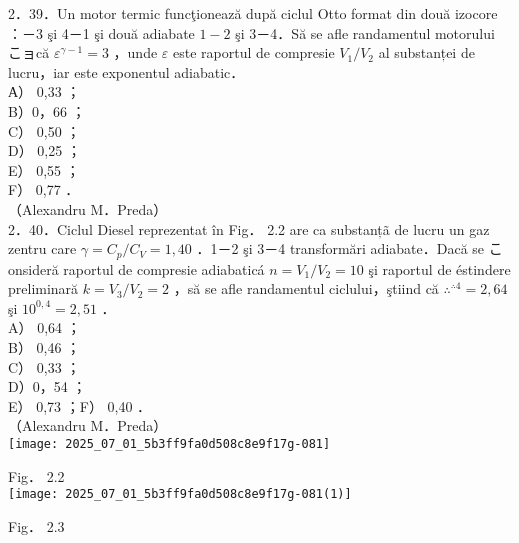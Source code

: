 2．39．Un motor termic funcţionează după ciclul Otto format din două izocore ：－3 şi 4－1 şi două adiabate $1-2$ şi 3－4．Să se afle randamentul motorului こョcă $\varepsilon^{\gamma-1}=3$ ，unde $\varepsilon$ este raportul de compresie $V_{1} / V_{2}$ al substanței de lucru，iar este exponentul adiabatic．\\
А） 0,33 ；\\
B）0，66 ；\\
C） 0,50 ；\\
D） 0,25 ；\\
E） 0,55 ；\\
F） 0,77 ．\\
（Alexandru M．Preda）\\
2．40．Ciclul Diesel reprezentat în Fig． 2.2 are ca substanțã de lucru un gaz zentru care $\gamma=C_{p} / C_{V}=1,40$ ．1－2 şi 3－4 transformări adiabate．Dacă se こonsideră raportul de compresie adiabaticá $n=V_{1} / V_{2}=10$ şi raportul de éstindere preliminară $k=V_{3} / V_{2}=2$ ，să se afle randamentul ciclului，ştiind că $\therefore^{\therefore 4}=2,64$ şi $10^{0,4}=2,51$ ．\\
A） 0,64 ；\\
B） 0,46 ；\\
C） 0,33 ；\\
D）0，54 ；\\
E） 0,73 ；F） 0,40 ．\\
（Alexandru M．Preda）\\
\texttt{[image: 2025\_07\_01\_5b3ff9fa0d508c8e9f17g-081]}

Fig． 2.2\\
\texttt{[image: 2025\_07\_01\_5b3ff9fa0d508c8e9f17g-081(1)]}

Fig． 2.3

